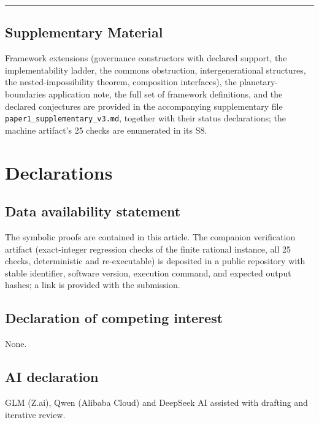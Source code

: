 \documentclass[11pt]{article}
\begin{document}
\begin{center}\rule{0.5\linewidth}{0.5pt}\end{center}

\subsection{Supplementary Material}\label{supplementary-material}

Framework extensions (governance constructors with declared support, the
implementability ladder, the commons obstruction, intergenerational
structures, the nested-impossibility theorem, composition interfaces),
the planetary-boundaries application note, the full set of framework
definitions, and the declared conjectures are provided in the
accompanying supplementary file \texttt{paper1\_supplementary\_v3.md},
together with their status declarations; the machine artifact's 25
checks are enumerated in its S8.

\section*{Declarations}

\subsection*{Data availability statement}

The symbolic proofs are contained in this article. The companion
verification artifact (exact-integer regression checks of the finite
rational instance, all 25 checks, deterministic and re-executable) is
deposited in a public repository with stable identifier, software
version, execution command, and expected output hashes; a link is
provided with the submission.

\subsection*{Declaration of competing interest}

None.

\subsection*{AI declaration}
GLM (Z.ai), Qwen (Alibaba Cloud) and DeepSeek AI assisted with drafting and iterative review.
\end{document}
